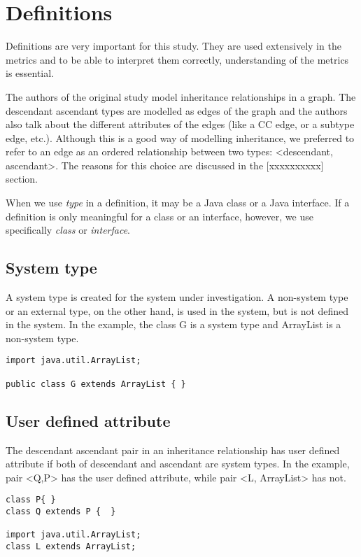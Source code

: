 \documentclass{uvamscse}
\begin{document}
\chapter{Definitions}
Definitions are very important for this study. They are used extensively in the metrics and to be able to interpret them correctly, understanding of the metrics is essential. 

The authors of the original study model inheritance relationships in a graph. The descendant ascendant types are modelled as edges of the graph and the authors also talk about the different attributes of the edges (like a CC edge, or a subtype edge, etc.). Although this is a good way of modelling inheritance, we preferred to refer to an edge as an ordered relationship between two types: <descendant, ascendant>. The reasons for this choice are discussed in the [xxxxxxxxxx] section.

When we use \emph{type} in a definition, it may be a Java class or a Java interface.  If a definition is only meaningful for a class or an interface, however, we use specifically \emph{class} or \emph{interface}.


\section{System type}
\begin{multicols}{2}
A system type is created for the system under investigation. A non-system type or an external type, on the other hand, is used in the system, but is not defined in the system. In the example, the class G is a system type and ArrayList is a non-system type.
\columnbreak
\begin{verbatim}
import java.util.ArrayList;  
    
public class G extends ArrayList { }
\end{verbatim}
\end{multicols}


\section{User defined attribute}
\begin{multicols}{2}
The descendant ascendant pair in an inheritance relationship has user defined attribute if both of descendant and ascendant are system types. In the example, pair <Q,P> has the user defined attribute, while pair <L, ArrayList> has not.
\columnbreak
\begin{verbatim}
class P{ }
class Q extends P {  }
   
import java.util.ArrayList;
class L extends ArrayList;
\end{verbatim}
\end{multicols}
\end{document}
